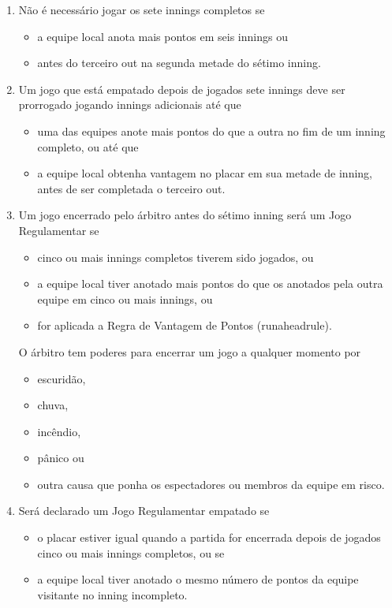 \begin{enumerate}[label=(\alph*)]

	\item Não é necessário jogar os sete \glspl{inning} completos se
	\begin{itemize}
		\item a equipe local anota mais pontos em seis \glspl{inning} ou
		\item antes do terceiro \gls{out} na segunda metade do sétimo \gls{inning}.
	\end{itemize}

	\item Um jogo que está empatado depois de jogados sete \glspl{inning} deve ser prorrogado jogando \glspl{inning} adicionais até que
	\begin{itemize}
		\item uma das equipes anote mais pontos do que a outra no fim de um \gls{inning} completo, ou até que
		\item a equipe local obtenha vantagem no placar em sua metade de \gls{inning}, antes de ser completada o terceiro \gls{out}.
	\end{itemize}

	\item Um jogo encerrado pelo árbitro antes do sétimo \gls{inning} será um Jogo Regulamentar se
	\begin{itemize}
		\item cinco ou mais \glspl{inning} completos tiverem sido jogados, ou
		\item a equipe local tiver anotado mais pontos do que os anotados pela  outra equipe em cinco ou mais \glspl{inning}, ou
		\item for aplicada a Regra de Vantagem de Pontos (\gls{runaheadrule}).
	\end{itemize}
	O árbitro tem poderes para encerrar um jogo a  qualquer momento por
	\begin{itemize}
		\item escuridão,
		\item chuva,
		\item incêndio,
		\item pânico ou
		\item outra causa que ponha os espectadores ou membros da equipe em risco.
	\end{itemize}

	\item Será declarado um Jogo Regulamentar empatado se
	\begin{itemize}
		\item o placar estiver igual quando a partida for encerrada depois de jogados cinco ou mais \glspl{inning} completos, ou se
		\item a equipe local tiver anotado o mesmo número de pontos da  equipe visitante no \gls{inning} incompleto.
	\end{itemize}


\end{enumerate}
